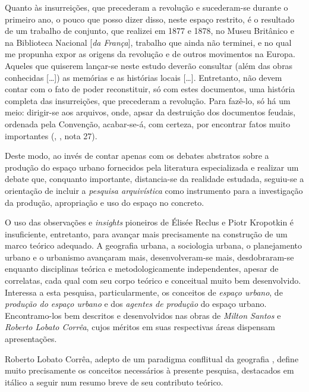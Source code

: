 \begin{citacao}
Quanto às insurreições, que precederam a revolução e sucederam-se durante o primeiro ano, o pouco que posso dizer disso, neste espaço restrito, é o resultado de um trabalho de conjunto, que realizei em 1877 e 1878, no Museu Britânico e na Biblioteca Nacional [\textit{da França}], trabalho que ainda não terminei, e no qual me propunha expor as origens da revolução e de outros movimentos na Europa. Aqueles que quiserem lançar-se neste estudo deverão consultar (além das obras conhecidas [{\dots}]) as memórias e as histórias locais [{\dots}]. Entretanto, não devem contar com o fato de poder reconstituir, só com estes documentos, uma história completa das insurreições, que precederam a revolução. Para fazê-lo, só há um meio: dirigir-se aos arquivos, onde, apsar da destruição dos documentos feudais, ordenada pela Convenção, acabar-se-á, com certeza, por encontrar fatos muito importantes (\citeauthor{KROPOTKIN2005f}, \citeyear{KROPOTKIN2005f},  nota 27).
\end{citacao}

Deste modo, ao invés de contar apenas com os debates abstratos sobre a produção do espaço urbano fornecidos pela literatura especializada e realizar um debate que, conquanto importante, distancia-se da realidade estudada, seguiu-se a orientação de incluir a \textit{pesquisa arquivística} como instrumento para a investigação da produção, apropriação e uso do espaço no concreto.

O uso das observações e \textit{insights} pioneiros de Élisée Reclus e Piotr Kropotkin é insuficiente, entretanto, para avançar mais precisamente na construção de um marco teórico adequado. A geografia urbana, a sociologia urbana, o planejamento urbano e o urbanismo avançaram mais, desenvolveram-se mais, desdobraram-se enquanto disciplinas teórica e metodologicamente independentes, apesar de correlatas, cada qual com seu corpo teórico e conceitual muito bem desenvolvido. Interessa a esta pesquisa, particularmente, os conceitos de \textit{espaço urbano}, de \textit{produção do espaço urbano} e dos \textit{agentes de produção} do espaço urbano. Encontramo-los bem descritos e desenvolvidos nas obras de \textit{Milton Santos} e \textit{Roberto Lobato Corrêa}, cujos méritos em suas respectivas áreas dispensam apresentações.

Roberto Lobato Corrêa, adepto de um paradigma conflitual da geografia \cite[p.~6]{CORREA1985espa}, define muito precisamente os conceitos necessários à presente pesquisa, destacados em itálico a seguir num resumo breve de seu contributo teórico. 

